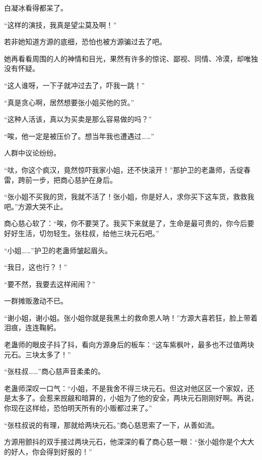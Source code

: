 \begin{this_body}
白凝冰看得都呆了。

“这样的演技，我真是望尘莫及啊！”

若非她知道方源的底细，恐怕也被方源骗过去了吧。

她再看看周围的人的神情和目光，果然有许多的惊诧、鄙视、同情、冷漠，却唯独没有怀疑。

“这人谁呀，一下子就冲过去了，吓我一跳！”

“真是贪心啊，居然想要张小姐买他的货。”

“这种人活该，真以为买卖是那么容易做的吗？”

“唉，他一定是被压价了。想当年我也遭遇过……”

人群中议论纷纷。

“呔，你这个疯汉，竟然惊吓我家小姐，还不快滚开！”那护卫的老蛊师，舌绽春雷，跨前一步，把商心慈护在身后。

“张小姐不买我的货，我就不活了！张小姐，你是好人，求你买下这车货，救救我吧。”方源大哭不止。

商心慈心软了：“唉，你不要哭了。我买下来就是了，生命是最可贵的，你今后要好好生活，切勿轻生。张柱叔，给他三块元石吧。”

“小姐……”护卫的老蛊师皱起眉头。

“我日，这也行？！”

“要不然，我要去这样闹闹？”

一群摊贩激动不已。

“谢小姐，谢小姐。张小姐你就是我黑土的救命恩人呐！”方源大喜若狂，脸上带着泪痕，连连鞠躬。

老蛊师的眼皮子抖了抖，看向方源身后的板车：“这车紫枫叶，最多也不过值两块元石。三块太多了！”

“张柱叔……”商心慈声音柔柔的。

老蛊师深叹一口气：“小姐，不是我舍不得三块元石。但这对他区区一个家奴，还是太多了。会惹来觊觎和暗算的，小姐为了他的安全，两块元石刚刚好啊。再说，你现在这样给，恐怕明天所有的小贩都过来了。”

“张柱叔说的有理，那就给两块元石。”商心慈思索了一下，从善如流。

方源用颤抖的双手接过两块元石，他深深的看了商心慈一眼：“张小姐你是个大大的好人，你会得到好报的！”

\end{this_body}

